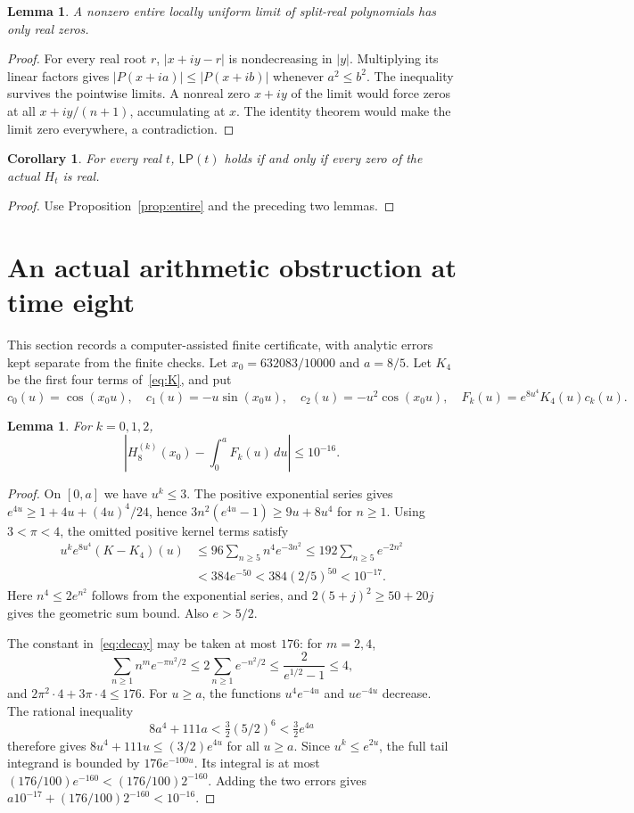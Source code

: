 \documentclass[11pt]{article}
\newtheorem{lemma}[theorem]{Lemma}
\newtheorem{corollary}[theorem]{Corollary}
\theoremstyle{remark}\newtheorem{remark}[theorem]{Remark}
\begin{document}
\begin{lemma}\label{lem:reverse}
A nonzero entire locally uniform limit of split-real
polynomials has only real zeros.
\end{lemma}
\begin{proof}
For every real root $r$, $|x+iy-r|$ is nondecreasing in $|y|$.
Multiplying its linear factors gives
$|P(x+ia)|\leq|P(x+ib)|$ whenever $a^2\leq b^2$.
The inequality survives the pointwise limits. A nonreal zero
$x+iy$ of the limit would force zeros at all
$x+iy/(n+1)$, accumulating at $x$. The identity theorem would
make the limit zero everywhere, a contradiction.
\end{proof}

\begin{corollary}\label{cor:LP}
For every real $t$, $\mathsf{LP}(t)$ holds if and only if every
zero of the actual $H_t$ is real.
\end{corollary}
\begin{proof}
Use Proposition~\ref{prop:entire} and the preceding two lemmas.
\end{proof}

\section{An actual arithmetic obstruction at time eight}
This section records a computer-assisted finite certificate,
with analytic errors kept separate from the finite checks.
Let $x_0=632083/10000$ and $a=8/5$. Let $K_4$ be the first
four terms of~\eqref{eq:K}, and put
\[
 c_0(u)=\cos(x_0u),\quad c_1(u)=-u\sin(x_0u),\quad
 c_2(u)=-u^2\cos(x_0u),\quad F_k(u)=e^{8u^4}K_4(u)c_k(u).
\]

\begin{lemma}\label{lem:cutoff}
For $k=0,1,2$,
\[
 \left|H_8^{(k)}(x_0)-\int_0^a F_k(u)\,du\right|\leq10^{-16}.
\]
\end{lemma}
\begin{proof}
On $[0,a]$ we have $u^k\leq3$. The positive exponential series
gives $e^{4u}\geq1+4u+(4u)^4/24$, hence
$3n^2(e^{4u}-1)\geq9u+8u^4$ for $n\geq1$.
Using $3<\pi<4$, the omitted positive kernel terms satisfy
\begin{align*}
 u^ke^{8u^4}(K-K_4)(u)
 &\leq96\sum_{n\geq5}n^4e^{-3n^2}
 \leq192\sum_{n\geq5}e^{-2n^2}\\
 &<384e^{-50}<384(2/5)^{50}<10^{-17}.
\end{align*}
Here $n^4\leq2e^{n^2}$ follows from the exponential series,
and $2(5+j)^2\geq50+20j$ gives the geometric sum bound.
Also $e>5/2$.

The constant in~\eqref{eq:decay} may be taken at most $176$:
for $m=2,4$,
\[
 \sum_{n\geq1}n^me^{-\pi n^2/2}
 \leq2\sum_{n\geq1}e^{-n^2/2}
 \leq\frac2{e^{1/2}-1}\leq4,
\]
and $2\pi^2\cdot4+3\pi\cdot4\leq176$.
For $u\geq a$, the functions $u^4e^{-4u}$ and $ue^{-4u}$
decrease. The rational inequality
\[
 8a^4+111a<\tfrac32(5/2)^6<\tfrac32e^{4a}
\]
therefore gives $8u^4+111u\leq(3/2)e^{4u}$ for all $u\geq a$.
Since $u^k\leq e^{2u}$, the full tail integrand is bounded by
$176e^{-100u}$. Its integral is at most
$(176/100)e^{-160}<(176/100)2^{-160}$.
Adding the two errors gives
$a10^{-17}+(176/100)2^{-160}<10^{-16}$.
\end{proof}
\end{document}

